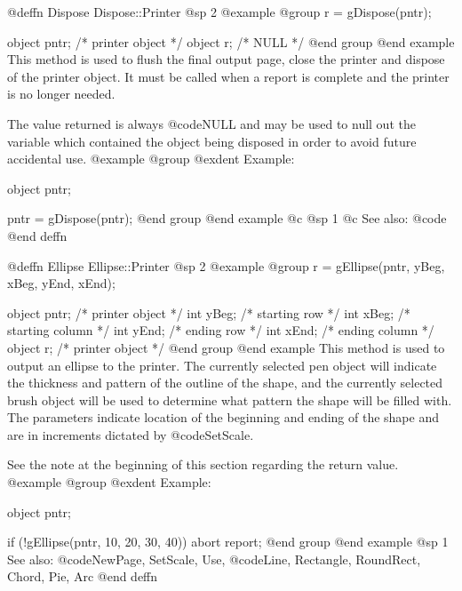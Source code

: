@deffn {Dispose} Dispose::Printer
@sp 2
@example
@group
r = gDispose(pntr); 

object  pntr;   /*  printer object  */
object  r;      /*  NULL            */
@end group
@end example
This method is used to flush the final output page, close the printer and
dispose of the printer object.  It must be called when a report is complete and the printer is no longer needed.

The value returned is always @code{NULL} and may be used to null out
the variable which contained the object being disposed in order to
avoid future accidental use.
@example
@group
@exdent Example:

object  pntr;

pntr = gDispose(pntr);
@end group
@end example
@c @sp 1
@c See also:  @code{}
@end deffn
















@deffn {Ellipse} Ellipse::Printer
@sp 2
@example
@group
r = gEllipse(pntr, yBeg, xBeg, yEnd, xEnd);

object  pntr;   /*  printer object   */
int     yBeg;   /*  starting row     */
int     xBeg;   /*  starting column  */
int     yEnd;   /*  ending row       */
int     xEnd;   /*  ending column    */
object  r;      /*  printer object   */
@end group
@end example
This method is used to output an ellipse to the printer.  The currently
selected pen object will indicate the thickness and pattern of the
outline of the shape, and the currently selected brush object will be
used to determine what pattern the shape will be filled with.  The
parameters indicate location of the beginning and ending of the shape
and are in increments dictated by @code{SetScale}.

See the note at the beginning of this section regarding the return value.
@example
@group
@exdent Example:

object  pntr;

if (!gEllipse(pntr, 10, 20, 30, 40))
        abort report;
@end group
@end example
@sp 1
See also:  @code{NewPage, SetScale, Use,}
        @code{Line, Rectangle, RoundRect, Chord, Pie, Arc}
@end deffn













